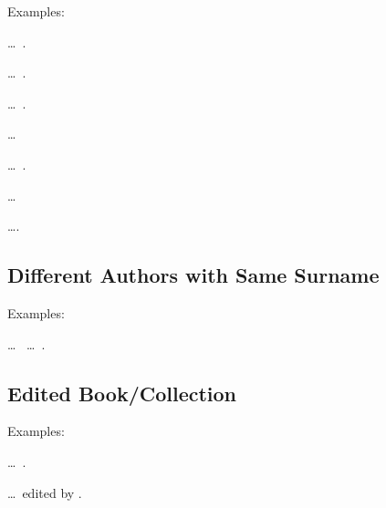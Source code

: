 \documentclass[a4paper, 11pt]{article}
\newcommand*{\subsectionRefSection}[1]{
    \subsection{#1}
    \refsection
}
\newcommand*{\printsubbibliographyEndRefSection}{
    \printbibliography[heading=subbibliography, title=Reference]
    \endrefsection
}
\newenvironment{agpsExample}{
    \setlength{\parindent}{0pt}
    \medskip
}
{}
\newenvironment{bareList}{%
    \begin{list}{}{}%
}
{\end{list}}
\begin{document}
\begin{agpsExample}

    Examples:

    \begin{bareList}
        \item \ldots\ \autocite[215]{LyonEtAl2002Circus}.
        \item \ldots\ \autocite[27]{LyonEtAl2002Clowns}.
        \item \ldots\ \autocites[215]{LyonEtAl2002Circus}[27]{LyonEtAl2002Clowns}[19]{LyonEtAl2008NoFurtheInform}.
        \item \textcites[215]{LyonEtAl2002Circus}[27]{LyonEtAl2002Clowns}[19]{LyonEtAl2008NoFurtheInform} \ldots
        \item \ldots\ \autocite{ChaffeeEtAl2002CriticThinkiThough}.
        \item \textcite{ChaffeeEtAl2002CriticThinkiThough} \ldots
        \item \ldots \autocite{Chaffee1998ThinkeWay8, ChaffeeEtAl2002CriticThinkiThough, Chaffee1991ThinkiCritic}.
    \end{bareList}

\end{agpsExample}

\nocite{Chaffee1991ThinkiCritic, Chaffee1998ThinkeWay8, ChaffeeEtAl2002CriticThinkiThough}%

\printsubbibliographyEndRefSection

\subsectionRefSection{Different Authors with Same Surname}

\begin{agpsExample}

    Examples:

    \begin{bareList}
        \item \ldots\ \textcite[12]{Smith1981TheoryMicroePolicy} \ldots\
        \autocite[65]{Smith1985MicroePolicyFramew}.
    \end{bareList}

\end{agpsExample}

\printsubbibliographyEndRefSection

\subsectionRefSection{Edited Book/Collection}

\begin{agpsExample}

    Examples:

    \begin{bareList}
        \item \ldots\ \autocite[ed.][27]{Brofenbrenner2005MakingHumanBeings}.
        \item \ldots\ edited by \autocite[27]{Brofenbrenner2005MakingHumanBeings}.
    \end{bareList}

\end{agpsExample}
\end{document}
